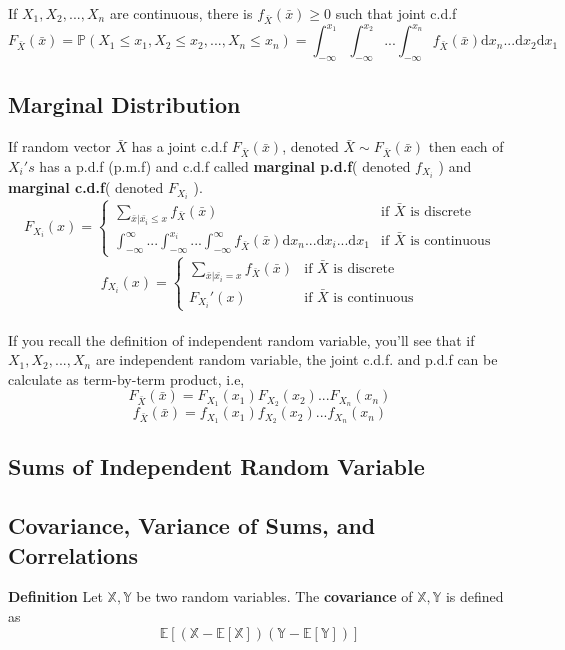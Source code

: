 \documentclass[a4paper,12pt]{article}
\begin{document}
If $X_1, X_2, ..., X_n$ are continuous, there is $f_{\bar{X}}(\bar{x}) \geq 0$ such that joint c.d.f
$$F_{\bar{X}}(\bar{x}) = \mathbb{P}( X_1 \leq x_1, X_2 \leq x_2, ..., X_n\leq x_n ) = \int_{-\infty}^{x_1}\int_{-\infty}^{x_2}...\int_{-\infty}^{x_n} f_{\bar{X}}(\bar{x}) \mathrm{d}x_n ... \mathrm{d}x_2 \mathrm{d}x_1$$

\subsection{Marginal Distribution}
If random vector $\bar{X}$ has a joint c.d.f $F_{\bar{X}}(\bar{x})$, denoted $\bar{X} \sim F_{\bar{X}}(\bar{x})$ then each of $X_i's$ has a p.d.f (p.m.f) and c.d.f called \textbf{marginal p.d.f}( denoted $f_{X_i}$ ) and \textbf{marginal c.d.f}( denoted $F_{X_i}$ ).
$$F_{X_i}(x) = 
  \begin{cases}
   \sum_{\bar{x} | \bar{x_i} \leq x} f_{\bar{X}}(\bar{x})  & \text{if }\bar{X}\text{ is discrete} \\
   \int_{-\infty}^{\infty}... \int_{-\infty}^{x_i}...\int_{-\infty}^{\infty} f_{\bar{X}}(\bar{x}) \mathrm{d}x_n ...\mathrm{d}x_i...\mathrm{d}x_1 & \text{if }\bar{X}\text{ is continuous}
  \end{cases}
$$
$$f_{X_i}(x) = 
  \begin{cases}
   \sum_{\bar{x} | \bar{x_i} = x} f_{\bar{X}}(\bar{x})  & \text{if }\bar{X}\text{ is discrete} \\
   F_{X_i}'(x) & \text{if }\bar{X}\text{ is continuous}
  \end{cases}
$$\\

If you recall the definition of independent random variable, you'll see that if $X_1, X_2, ..., X_n$ are independent random variable, the joint c.d.f. and p.d.f can be calculate as term-by-term product, i.e, 
$$F_{\bar{X}}( \bar{x} ) = F_{X_1}(x_1)F_{X_2}(x_2)...F_{X_n}(x_n)$$
$$f_{\bar{X}}( \bar{x} ) = f_{X_1}(x_1)f_{X_2}(x_2)...f_{X_n}(x_n)$$

\subsection{Sums of Independent Random Variable}

\subsection{Covariance, Variance of Sums, and Correlations}

\textbf{Definition} Let $\mathbb{X}, \mathbb{Y}$ be two random variables. The \textbf{covariance} of $\mathbb{X}, \mathbb{Y}$ is defined as
$$\mathbb{E}[(\mathbb{X} - \mathbb{E}[\mathbb{X}])(\mathbb{Y} - \mathbb{E}[\mathbb{Y}])]$$\\
\end{document}
